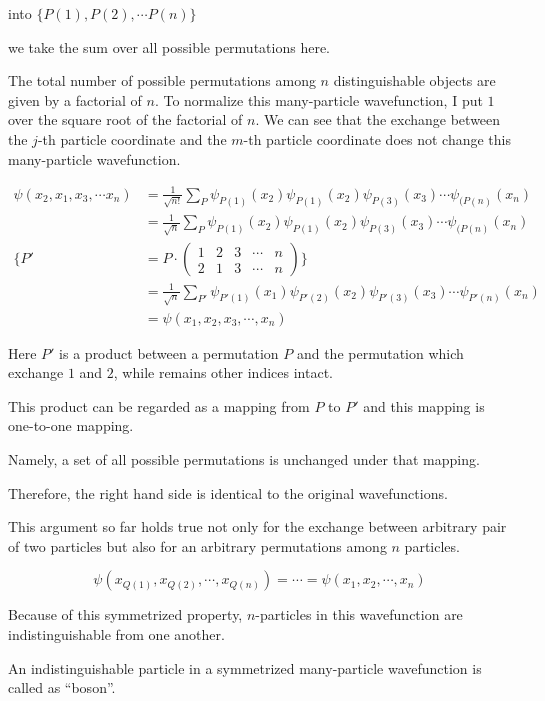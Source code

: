 ﻿\documentclass[twoside]{book}
\numberwithin{equation}{section}
\begin{document}
into $\{P(1),P(2),\cdots P(n)\}$

we take the sum over all possible permutations here. 

The total number of possible permutations among $n$ distinguishable objects are given by a factorial of $n$. To normalize this many-particle wavefunction, I put $1$ over the square root of the factorial of $n$. We can see that the exchange between the $j$-th particle coordinate and the $m$-th particle coordinate does not change this many-particle wavefunction. 

\[\begin{split}
\psi(x_2,x_1,x_3,\cdots x_n) &= \frac{1}{\sqrt{n!}}\sum_P\psi_{P(1)}(x_2)\psi_{P(1)}(x_2)\psi_{P(3)}(x_3)\cdots\psi_{(P(n)}(x_n)\\
&=\frac{1}{\sqrt{n}}\sum_P\psi_{P(1)}(x_2)\psi_{P(1)}(x_2)\psi_{P(3)}(x_3)\cdots\psi_{(P(n)}(x_n)\\
\Big\{P' &= P\cdot\left(
\begin{matrix}
1 & 2 & 3 & \cdots & n\\
2 & 1 & 3 & \cdots & n
\end{matrix}\right)\Big\}\\
&=\frac{1}{\sqrt{n}}\sum_{P'}\psi_{P'(1)}(x_1)\psi_{P'(2)}(x_2)\psi_{P'(3)}(x_3)\cdots\psi_{P'(n)}(x_n)\\
&= \psi(x_1,x_2,x_3,\cdots, x_n)
\end{split}\]

Here $P'$ is a product between a permutation $P$ and the permutation which exchange $1$ and $2$, while remains other indices intact. 

This product can be regarded as a mapping from $P$ to $P'$ and this mapping is one-to-one mapping. 

Namely, a set of all possible permutations is unchanged under that mapping. 

Therefore, the right hand side is identical to the original wavefunctions. 

This argument so far holds true not only for the exchange between arbitrary pair of two particles but also for an arbitrary permutations among $n$ particles. 

\[\psi(x_{Q(1)},x_{Q(2)},\cdots,x_{Q(n)}) = \cdots=\psi(x_1,x_2,\cdots,x_n) \]

Because of this symmetrized property, $n$-particles in this wavefunction are indistinguishable from one another. 

An indistinguishable particle in a symmetrized many-particle wavefunction is called as ``boson''. 
\end{document}

